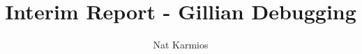 \documentclass[a4paper, twoside]{report}
\title{Interim Report - Gillian Debugging}
\author{Nat Karmios}
\begin{document}
\def\chapterautorefname{\normalcolor{Chapter}\color{blue}}
\def\sectionautorefname{\normalcolor{\S}\kern-0.7ex\color{blue}}
\def\subsectionautorefname{\normalcolor{\S}\kern-0.7ex\color{blue}}
\def\figureautorefname{\normalcolor{Figure}\color{blue}}
\def\lstnumberautorefname{\normalcolor{line}\color{blue}}



\tableofcontents







\end{document}
